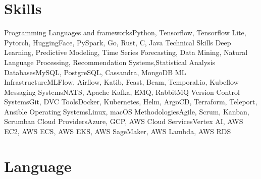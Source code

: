 \section{Skills}

\cvline%
{Programming Languages and frameworks}{Python, Tensorflow, Tensorflow Lite, Pytorch, HuggingFace, PySpark, Go, Rust, C, Java}
\cvline%
{Technical Skills} {Deep Learning, Predictive Modeling, Time Series Forecasting, Data Mining, Natural Language Processing, Recommendation Systems,Statistical Analysis}
\cvline%
{Databases}{MySQL, PostgreSQL, Cassandra, MongoDB}
\cvline%
{ML Infrastructure}{MLFlow, Airflow, Katib, Feast, Beam, Temporal.io, Kubeflow}
\cvline%
{Messaging Systems}{NATS, Apache Kafka, EMQ, RabbitMQ}
\cvline%
{Version Control Systems}{Git, DVC}
\cvline%
{Tools}{Docker, Kubernetes, Helm, ArgoCD, Terraform, Teleport, Ansible}
\cvline%
{Operating Systems}{Linux, macOS}
\cvline%
{Methodologies}{Agile, Scrum, Kanban, Scrumban}
\cvline%
{Cloud Providers}{Azure, GCP, AWS}
\cvline%
{Cloud Services}{Vertex AI, AWS EC2, AWS ECS, AWS EKS, AWS SageMaker, AWS Lambda, AWS RDS}

\section{Language}


\emptysection{}\closesection{}

